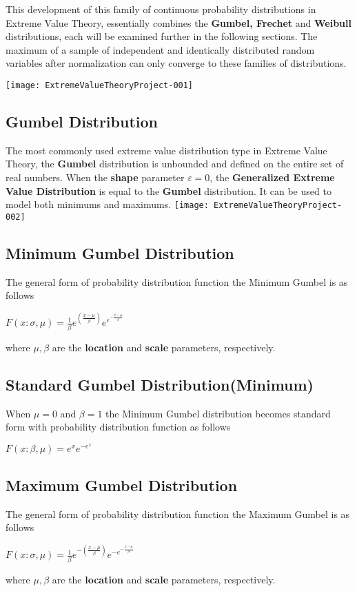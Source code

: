 \documentclass[11pt,a4paper]{article}
\theoremstyle{plain}
\begin{document}
This development of this family of continuous probability distributions in Extreme Value Theory, essentially combines the \textbf{Gumbel, Frechet} and \textbf{Weibull} distributions, each will be examined further in the following sections. The maximum of a sample of independent and identically distributed random variables after normalization can only converge to these families of distributions. 


\texttt{[image: ExtremeValueTheoryProject-001]}


\subsection*{Gumbel Distribution} 
The most commonly used extreme value distribution type in Extreme Value Theory, the \textbf{Gumbel} distribution is unbounded and defined on the entire set of real numbers. 
When the \textbf{shape} parameter $\varepsilon=0$, the \textbf{Generalized Extreme Value Distribution} is equal to the \textbf{Gumbel} distribution.
It can be used to model both minimums and maximums.
\texttt{[image: ExtremeValueTheoryProject-002]}



\subsection*{Minimum Gumbel Distribution}
The general form of probability distribution function the Minimum Gumbel is as follows
\begin{center}
$F(x:\sigma,\mu)=\frac{1}{\beta}e^{(\frac{x-\mu}{\beta})}e^{e^{-\frac{x-\mu}{\beta}}}$
\end{center}
where  $\mu,\beta$ are the \textbf{location} and \textbf{scale} parameters, respectively.


\subsection*{Standard Gumbel Distribution(Minimum)}
When $\mu=0$ and $\beta=1$ the Minimum Gumbel distribution becomes standard form with probability distribution function as follows
\begin{center}
$F(x:\beta,\mu)=e^{x}e^{-e^{x}}$
\end{center}

\subsection*{Maximum Gumbel Distribution}
The general form of probability distribution function the Maximum Gumbel is as follows
\begin{center}
$F(x:\sigma,\mu)=\frac{1}{\beta}e^{-(\frac{x-\mu}{\beta})}e^{-e^{-\frac{x-\mu}{\beta}}}$
\end{center}
where  $\mu,\beta$ are the \textbf{location} and \textbf{scale} parameters, respectively.
\end{document}

